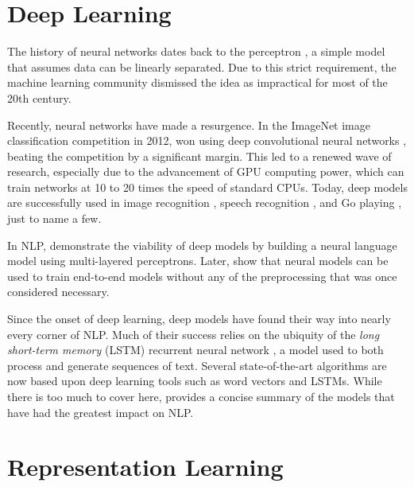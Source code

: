 \documentclass[12pt]{report}
\begin{document}
\section{Deep Learning}

The history of neural networks dates back to the perceptron \citep{Rosenblatt1958}, a simple model that assumes data can be linearly separated. Due to this strict requirement, the machine learning community dismissed the idea as impractical for most of the 20th century.


Recently, neural networks have made a resurgence. In the ImageNet image classification competition in 2012, \citet{Krizhevsky2012} won using deep convolutional neural networks \citep{LeCun1995}, beating the competition by a significant margin. This led to a renewed wave of research, especially due to the advancement of GPU computing power, which can train networks at 10 to 20 times the speed of standard CPUs. Today, deep models are successfully used in image recognition \citep{Farabet2013}, speech recognition \citep{Hinton2012}, and Go playing \citep{Silver2016}, just to name a few.


In NLP,  \citet{Bengio2003} demonstrate the viability of deep models by building a neural language model using multi-layered perceptrons. Later, \citet{Collobert2011} show that neural models can be used to train end-to-end models without any of the preprocessing that was once considered necessary.

Since the onset of deep learning, deep models have found their way into nearly every corner of NLP. Much of their success relies on the ubiquity of the \emph{long short-term memory} (LSTM) recurrent neural network \citep{hochreiter1997long}, a model used to both process and generate sequences of text.
Several state-of-the-art algorithms are now based upon deep learning tools such as word vectors and LSTMs. While there is too much to cover here, \citet{goldberg2015primer} provides a concise summary of the models that have had the greatest impact on NLP. %

\section{Representation Learning}
\end{document}
